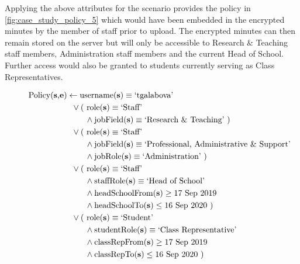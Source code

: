 Applying the above attributes for the scenario provides the policy in \cref{fig:case_study_policy_5} which would have been embedded in the encrypted minutes by the member of staff prior to upload. The encrypted minutes can then remain stored on the server but will only be accessible to Research \& Teaching staff members, Administration staff members and the current Head of School. Further access would also be granted to students currently serving as Class Representatives.

\begin{figure}[ht]
  \centering
\begin{align*}
  \text{Policy(\textbf{s},\textbf{e})}
  &
    \leftarrow
    \text{username(\textbf{s})} \equiv \text{`tgalabova'}
  \\
  &
    \phantom{::}\vee
    \text{( role(\textbf{s})} \equiv \text{`Staff'}
  \\
  &
    \phantom{::::::::}\wedge
    \text{jobField(\textbf{s})} \equiv \text{`Research \& Teaching' )}
  \\
  &
    \phantom{::}\vee
    \text{( role(\textbf{s})} \equiv \text{`Staff'}
  \\
  &
    \phantom{::::::::}\wedge
    \text{jobField(\textbf{s})} \equiv \text{`Professional, Administrative \& Support'}
  \\
  &
    \phantom{::::::::}\wedge
    \text{jobRole(\textbf{s})} \equiv \text{`Administration' )}
  \\
  &
    \phantom{::}\vee
    \text{( role(\textbf{s})} \equiv \text{`Staff'}
  \\
  &
    \phantom{::::::::}\wedge
    \text{staffRole(\textbf{s})} \equiv \text{`Head of School'}
  \\
  &
    \phantom{::::::::}\wedge
    \text{headSchoolFrom(\textbf{s})} \geq \text{17 Sep 2019}
  \\
  &
    \phantom{::::::::}\wedge
    \text{headSchoolTo(\textbf{s})} \leq \text{16 Sep 2020 )}
  \\
  &
    \phantom{::}\vee
    \text{( role(\textbf{s})} \equiv \text{`Student'}
  \\
  &
    \phantom{::::::::}\wedge
    \text{studentRole(\textbf{s})} \equiv \text{`Class Representative'}
  \\
  &
    \phantom{::::::::}\wedge
    \text{classRepFrom(\textbf{s})} \geq \text{17 Sep 2019}
  \\
  &
    \phantom{::::::::}\wedge
    \text{classRepTo(\textbf{s})} \leq \text{16 Sep 2020 )}
  \\

\end{align*}
\end{figure}
